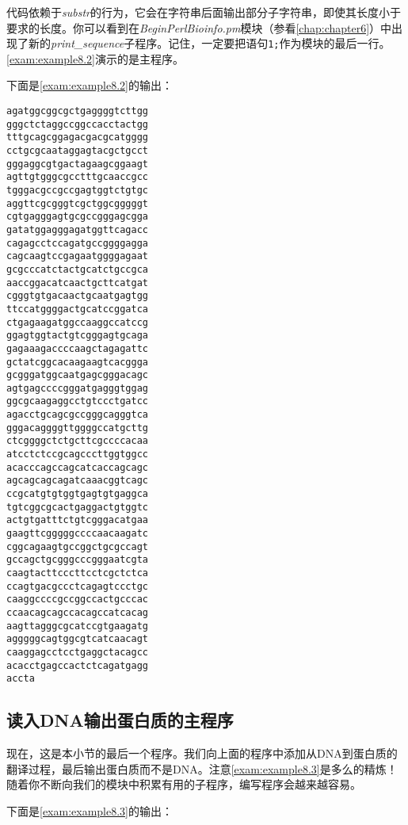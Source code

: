 代码依赖于\textit{substr}的行为，它会在字符串后面输出部分子字符串，即使其长度小于要求的长度。你可以看到在\textit{BeginPerlBioinfo.pm}模块（参看\autoref{chap:chapter6}）中出现了新的\textit{print\_sequence}子程序。记住，一定要把语句\verb|1;|作为模块的最后一行。\autoref{exam:example8.2}演示的是主程序。



下面是\autoref{exam:example8.2}的输出：

\begin{lstlisting}
agatggcggcgctgaggggtcttgg
gggctctaggccggccacctactgg
tttgcagcggagacgacgcatgggg
cctgcgcaataggagtacgctgcct
gggaggcgtgactagaagcggaagt
agttgtgggcgcctttgcaaccgcc
tgggacgccgccgagtggtctgtgc
aggttcgcgggtcgctggcgggggt
cgtgagggagtgcgccgggagcgga
gatatggagggagatggttcagacc
cagagcctccagatgccggggagga
cagcaagtccgagaatggggagaat
gcgcccatctactgcatctgccgca
aaccggacatcaactgcttcatgat
cgggtgtgacaactgcaatgagtgg
ttccatggggactgcatccggatca
ctgagaagatggccaaggccatccg
ggagtggtactgtcgggagtgcaga
gagaaagaccccaagctagagattc
gctatcggcacaagaagtcacggga
gcgggatggcaatgagcgggacagc
agtgagccccgggatgagggtggag
ggcgcaagaggcctgtccctgatcc
agacctgcagcgccgggcagggtca
gggacaggggttggggccatgcttg
ctcggggctctgcttcgccccacaa
atcctctccgcagcccttggtggcc
acacccagccagcatcaccagcagc
agcagcagcagatcaaacggtcagc
ccgcatgtgtggtgagtgtgaggca
tgtcggcgcactgaggactgtggtc
actgtgatttctgtcgggacatgaa
gaagttcgggggccccaacaagatc
cggcagaagtgccggctgcgccagt
gccagctgcgggcccgggaatcgta
caagtacttcccttcctcgctctca
ccagtgacgccctcagagtccctgc
caaggccccgccggccactgcccac
ccaacagcagccacagccatcacag
aagttagggcgcatccgtgaagatg
agggggcagtggcgtcatcaacagt
caaggagcctcctgaggctacagcc
acacctgagccactctcagatgagg
accta
\end{lstlisting}

\subsection{读入DNA输出蛋白质的主程序}
现在，这是本小节的最后一个程序。我们向上面的程序中添加从DNA到蛋白质的翻译过程，最后输出蛋白质而不是DNA。注意\autoref{exam:example8.3}是多么的精炼！随着你不断向我们的模块中积累有用的子程序，编写程序会越来越容易。



下面是\autoref{exam:example8.3}的输出：

